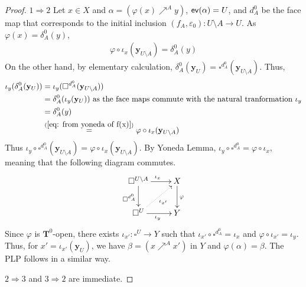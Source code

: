 \documentclass[11pt,a4paper,oldfontcommands]{memoir}
\newcommand*\ev{\textup{\textsf{ev}}}
\newcommand{\TrO}{\mathbf{T}}
\begin{document}
\begin{proof}
$1 \Rightarrow 2$ Let $x\in X$ and $\alpha=(\varphi(x)\nearrow^A y)$, $\ev (\alpha)=U$, and $d^0_A$ be the face map that corresponds to the initial inclusion $(f_A,\varepsilon_0): U\setminus A \to U$. As $\varphi(x)=\delta_A^0(y)$, 
\begin{align} \label{eq: from yoneda of f(x)}
\varphi \circ \iota_{x}(\mathbf{y}_{U\setminus A})=\delta_A^0(y)    
\end{align}
On the other hand, by elementary calculation, $\delta_A^0(\mathbf{y}_U)=\square^{d_A^0}(\mathbf{y}_{U\setminus A})$. Thus, 
\begin{align*}
\iota_{y}(\delta_A^0(\mathbf{y}_U)) & =\iota_{y} (\square^{d_A^0}(\mathbf{y}_{U\setminus A}))\\
& = \delta_A^0(\iota_{y}(\mathbf{y}_U)) \text{ as the face maps commute with the natural tranformation } \iota_y\\
& = \delta_A^0(y) \\
& \stackrel{(\ref{eq: from yoneda of f(x)})}{=} \varphi \circ \iota_{x}(\mathbf{y}_{U\setminus A}) 
\end{align*}
Thus $\iota_{y} \circ \square^{d_A^0}(\mathbf{y}_{U\setminus A})=\varphi \circ \iota_{x}(\mathbf{y}_{U\setminus A})$. By Yoneda Lemma, $\iota_{y} \circ \square^{d_A^0}=\varphi \circ \iota_{x}$, meaning that the following diagram commutes.
$$    \xymatrix{%
      \square^{U\setminus A} \ar[r]^{\iota_{x}}
      \ar[d]_{\square^{d_A^0}} \ar@{}[dr]  &
      X \ar[d]^{\varphi} \\
      \square^U  \ar[r]_{\iota_{y}} \ar@{.>}[ur]_{\iota_{x'}}  & Y  
    }
$$
Since $\varphi$ is $\TrO^0$-open, there exists $\iota_{x'}: \square^{U} \to Y$ such that $\iota_{x'} \circ \square^{d_A^0}= \iota_{x}$ and $ \varphi \circ \iota_{x'} = \iota_{y}$. Thus, %
for $x'=\iota_{x'}(\mathbf{y}_{U})$, we have $\beta=(x \nearrow^Ax')$ in $Y$ and $\varphi(\alpha)= \beta$. The PLP follows in a similar way.

$2 \Rightarrow 3$ and $3 \Rightarrow 2$ are immediate.


\end{proof}
\end{document}
